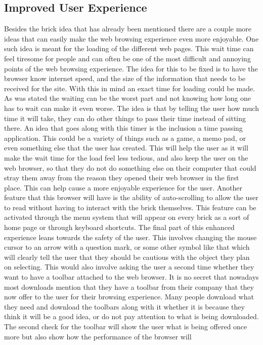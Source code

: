 \documentclass[11pt]{article}
\begin{document}
\subsection{Improved User Experience}
Besides the brick idea that has already been mentioned there are a couple more ideas that can easily make the web browsing experience even more enjoyable. One such idea is meant for the loading of the different web pages. This wait time can feel tiresome for people and can often be one of the most difficult and annoying points of the web browsing experience. The idea for this to be fixed is to have the browser know internet speed, and the size of the information that needs to be received for the site. With this in mind an exact time for loading could be made. As was stated the waiting can be the worst part and not knowing how long one has to wait can make it even worse. The idea is that by telling the user how much time it will take, they can do other things to pass their time instead of sitting there. An idea that goes along with this timer is the inclusion a time passing application. This could be a variety of things such as a game, a memo pad, or even something else that the user has created. This will help the user as it will make the wait time for the load feel less tedious, and also keep the user on the web browser, so that they do not do something else on their computer that could stray them away from the reason they opened their web browser in the first place. This can help cause a more enjoyable experience for the user. Another feature that this browser will have is the ability of auto-scrolling to allow the user to read without having to interact with the brick themselves. This feature can be activated through the menu system that will appear on every brick as a sort of home page or through keyboard shortcuts. The final part of this enhanced experience leans towards the safety of the user. This involves changing the mouse cursor to an arrow with a question mark, or some other symbol like that which will clearly tell the user that they should be cautious with the object they plan on selecting. This would also involve asking the user a second time whether they want to have a toolbar attached to the web browser. It is no secret that nowadays most downloads mention that they have a toolbar from their company that they now offer to the user for their browsing experience. Many people download what they need and download the toolbars along with it whether it is because they think it will be a good idea, or do not pay attention to what is being downloaded. The second check for the toolbar will show the user what is being offered once more but also show how the performance of the browser will 
\end{document}
